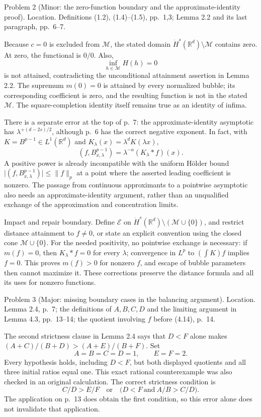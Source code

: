 \documentclass[10pt]{article}
\begin{document}
Problem 2 (Minor: the zero-function boundary and the approximate-identity proof).  Location. Definitions (1.2), (1.4)–(1.5), pp. 1,3; Lemma 2.2 and its last paragraph, pp. 6–7.\par
Because \(c=0\) is excluded from \(\mathcal M\), the stated domain \(\dot H^s(\mathbb R^d)\setminus\mathcal M\) contains zero. At zero, the functional is \(0/0\). Also, \[\inf_{h\in\mathcal M}H(h)=0\] is not attained, contradicting the unconditional attainment assertion in Lemma 2.2. The supremum \(m(0)=0\) is attained by every normalized bubble; its corresponding coefficient is zero, and the resulting function is not in the stated \(\mathcal M\). The square-completion identity itself remains true as an identity of infima.\par
There is a separate error at the top of p. 7: the approximate-identity asymptotic has \(\lambda^{+(d-2s)/2}\), although p. 6 has the correct negative exponent. In fact, with \(K=B^{p-1}\in L^1(\mathbb R^d)\) and \(K_\lambda(x)=\lambda^dK(\lambda x)\), \[(f,B_{x,\lambda}^{p-1})=\lambda^{-a}(K_\lambda*f)(x).\] A positive power is already incompatible with the uniform Hölder bound \(\lvert(f,B_{x,\lambda}^{p-1})\rvert\le\|f\|_p\) at a point where the asserted leading coefficient is nonzero. The passage from continuous approximants to a pointwise asymptotic also needs an approximate-identity argument, rather than an unqualified exchange of the approximation and concentration limits.\par
Impact and repair boundary. Define \(\mathcal E\) on \(\dot H^s(\mathbb R^d)\setminus(\mathcal M\cup\{0\})\), and restrict distance attainment to \(f\ne0\), or state an explicit convention using the closed cone \(\mathcal M\cup\{0\}\). For the needed positivity, no pointwise exchange is necessary: if \(m(f)=0\), then \(K_\lambda*f=0\) for every \(\lambda\); convergence in \(L^p\) to \((\int K)f\) implies \(f=0\). This proves \(m(f)>0\) for nonzero \(f\), and escape of bubble parameters then cannot maximize it. These corrections preserve the distance formula and all its uses for nonzero functions.\par
Problem 3 (Major: missing boundary cases in the balancing argument).  Location. Lemma 2.4, p. 7; the definitions of \(A,B,C,D\) and the limiting argument in Lemma 4.3, pp. 13–14; the quotient involving \(f\) before (4.14), p. 14.\par
The second strictness clause in Lemma 2.4 says that \(D<F\) alone makes \((A+C)/(B+D)>(A+E)/(B+F)\). Set \[A=B=C=D=1,\qquad E=F=2.\] Every hypothesis holds, including \(D<F\), but both displayed quotients and all three initial ratios equal one. This exact rational counterexample was also checked in an original calculation. The correct strictness condition is \[C/D>E/F
 \quad\text{or}\quad
 \bigl(D<F\ \text{and}\ A/B>C/D\bigr).\] The application on p. 13 does obtain the first condition, so this error alone does not invalidate that application.\par
\end{document}
